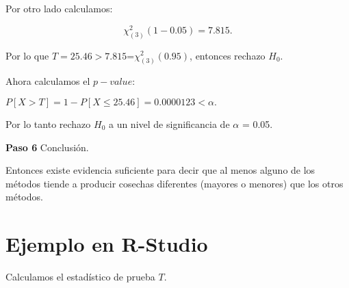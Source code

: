 \documentclass[
  a4paper,
  oneside,
  openany]{book}
\begin{document}
Por otro lado calculamos:

\[\chi_{(3)}^2(1-0.05)=7.815.\]

Por lo que \(T=25.46 > 7.815\)=\(\chi_{(3)}^2(0.95)\), entonces rechazo \(H_0\).

Ahora calculamos el \(p-value\):

\(P[X>T]= 1-P[X\leq 25.46]=0.0000123 < \alpha.\)

Por lo tanto rechazo \(H_0\) a un nivel de significancia de \(\alpha\) = 0.05.

\textbf{Paso 6} Conclusión.

Entonces existe evidencia suficiente para decir que al menos alguno de los métodos tiende a producir cosechas diferentes (mayores o menores) que los otros métodos.

\hypertarget{ejemplo-en-r-studio-6}{%
\section{Ejemplo en R-Studio}\label{ejemplo-en-r-studio-6}}

Calculamos el estadístico de prueba \(T\).
\end{document}

